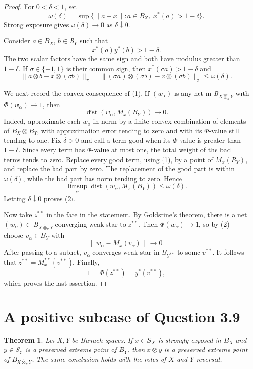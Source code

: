 \documentclass[11pt]{article}
\newtheorem{theorem}{Theorem}
\newcommand{\pt}{\widehat{\otimes}_{\pi}}
\newcommand{\dist}{\operatorname{dist}}
\begin{document}
\begin{proof}
For $0<\delta<1$, set
\[
 \omega(\delta)=
 \sup\{\|a-x\|:a\in B_X,\ x^*(a)>1-\delta\}.
\]
Strong exposure gives $\omega(\delta)\to0$ as $\delta\downarrow0$.

Consider $a\in B_X$, $b\in B_Y$ such that
\[
  x^*(a)y^*(b)>1-\delta.
\]
The two scalar factors have the same sign and both have modulus greater than
$1-\delta$. If $\sigma\in\{-1,1\}$ is their common sign, then
$x^*(\sigma a)>1-\delta$ and
\[
 \|a\otimes b-x\otimes(\sigma b)\|_\pi
 =\|(\sigma a)\otimes(\sigma b)-x\otimes(\sigma b)\|_\pi
 \le \omega(\delta).
 \tag{1}
\]

We next record the convex consequence of (1). If $(w_\alpha)$ is any net in
$B_{X\pt Y}$ with $\Phi(w_\alpha)\to1$, then
\[
  \dist(w_\alpha,M_x(B_Y))\longrightarrow0.
  \tag{2}
\]
Indeed, approximate each $w_\alpha$ in norm by a finite convex combination of
elements of $B_X\otimes B_Y$, with approximation error tending to zero and
with its $\Phi$-value still tending to one. Fix $\delta>0$ and call a term
good when its $\Phi$-value is greater than $1-\delta$. Since every term has
$\Phi$-value at most one, the total weight of the bad terms tends to zero.
Replace every good term, using (1), by a point of $M_x(B_Y)$, and replace the
bad part by zero. The replacement of the good part is within
$\omega(\delta)$, while the bad part has norm tending to zero. Hence
\[
  \limsup_\alpha\dist(w_\alpha,M_x(B_Y))\le\omega(\delta).
\]
Letting $\delta\downarrow0$ proves (2).

Now take $z^{**}$ in the face in the statement. By Goldstine's theorem, there
is a net $(w_\alpha)\subset B_{X\pt Y}$ converging weak-star to $z^{**}$.
Then $\Phi(w_\alpha)\to1$, so by (2) choose $v_\alpha\in B_Y$ with
\[
  \|w_\alpha-M_x(v_\alpha)\|\longrightarrow0.
\]
After passing to a subnet, $v_\alpha$ converges weak-star in $B_{Y^{**}}$ to
some $v^{**}$. It follows that
$z^{**}=M_x^{**}(v^{**})$. Finally,
\[
  1=\Phi(z^{**})=y^*(v^{**}),
\]
which proves the last assertion.
\end{proof}

\section{A positive subcase of Question 3.9}

\begin{theorem}\label{thm:preserved}
Let $X,Y$ be Banach spaces. If $x\in S_X$ is strongly exposed in $B_X$ and
$y\in S_Y$ is a preserved extreme point of $B_Y$, then $x\otimes y$ is a
preserved extreme point of $B_{X\pt Y}$. The same conclusion holds with the
roles of $X$ and $Y$ reversed.
\end{theorem}
\end{document}
